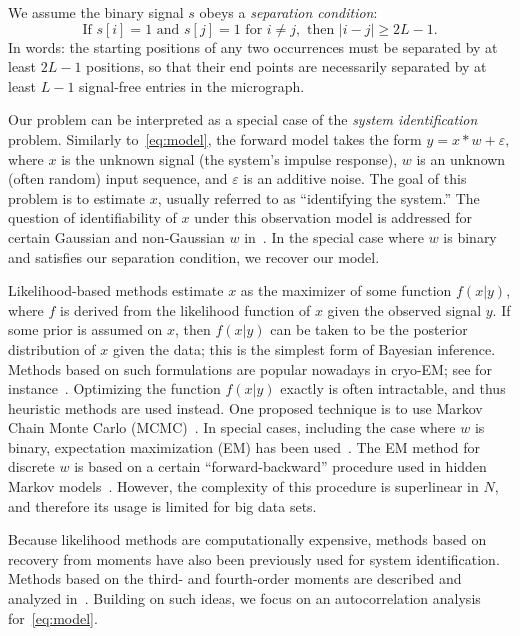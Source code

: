 \documentclass[12pt]{article}
\newcommand{\1}{\mathbf{1}}
\theoremstyle{plain}
\theoremstyle{definition}
\theoremstyle{remark}
\theoremstyle{plain}
\theoremstyle{remark}
\theoremstyle{plain}
\theoremstyle{plain}
\begin{document}
We assume the binary signal $s$ obeys a \emph{separation condition}:
\begin{equation}
\textrm{If } s[i] = 1 \textrm{ and } s[j] = 1 \textrm{ for } i \neq j, \textrm{ then } |i - j| \geq 2L-1.
\label{eq:spacing}
\end{equation}
In words: the starting positions of any two occurrences  must be separated by at least $2L-1$ positions, so that their end points are necessarily separated by at least $L-1$ signal-free entries in the micrograph.

Our problem can be interpreted as a special case of the \emph{system identification} problem. Similarly to~\eqref{eq:model}, the
forward model takes the form
%
\begin{math}
%
y = x\ast w + \varepsilon,  
%
\end{math} 
%
where $x$ is the unknown signal (the system's impulse response), $w$ is an unknown (often random) input sequence, and $\varepsilon$ is an additive noise.
The goal of this problem is to estimate $x$, usually referred to as ``identifying the system.'' The question of identifiability of $x$ under this observation model is addressed for certain Gaussian and non-Gaussian $w$ in~\cite{benveniste1980robust,kormylo1983identifiability}. In the special case where $w$ is binary and satisfies our separation condition, we recover our model. 

Likelihood-based methods estimate $x$ as the maximizer of some function $f(x | y)$, where $f$ is derived from the likelihood function of $x$ given the observed signal $y$.  
If some prior is assumed on $x$, then $f(x|y)$ can be taken to be the posterior distribution of $x$ given the data; this is the simplest form of Bayesian inference.
Methods based on such formulations are popular nowadays in cryo-EM; see for instance~\cite{sigworth1998maximum,scheres2012relion}. 
Optimizing the function $f(x|y)$ exactly is often intractable, and thus heuristic methods are used instead. One proposed technique is to use Markov Chain Monte Carlo (MCMC)~\cite{cappe1999simulation}. 
In special cases, including the case where $w$ is binary, expectation maximization (EM) has been used~\cite{cappe1999simulation}. The EM method for discrete $w$ is based on a certain ``forward-backward'' procedure used in hidden Markov models~\cite{rabiner1989tutorial}. However, the complexity of this procedure is superlinear in $N$, and therefore its usage is limited for big data sets. 

Because likelihood methods are computationally expensive, methods based on recovery from moments have also been previously used for system identification. Methods based on the third- and fourth-order moments are described and analyzed in~\cite{lii1982deconvolution,giannakis1989identification,tugnait1984identification}. Building on such ideas, we focus on an autocorrelation analysis for~\eqref{eq:model}. 
\end{document}
